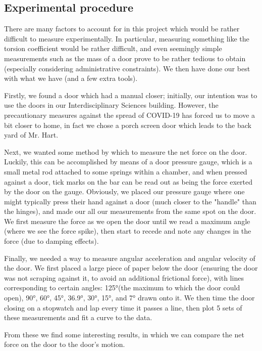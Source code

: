     \subsection{Experimental procedure}
    There are many factors to account for in this project which would be rather difficult to measure experimentally. In particular, measuring something like the torsion coefficient would be rather difficult, and even seemingly simple measurements such as the mass of a door prove to be rather tedious to obtain (especially considering administrative constraints). We then have done our best with what we have (and a few extra tools).\par
    Firstly, we found a door which had a manual closer; initially, our intention was to use the doors in our Interdisciplinary Sciences building. However, the precautionary measures against the spread of COVID-19 has forced us to move a bit closer to home, in fact we chose a porch screen door which leads to the back yard of Mr. Hart.\par
    Next, we wanted some method by which to measure the net force on the door. Luckily, this can be accomplished by means of a door pressure gauge, which is a small metal rod attached to some springs within a chamber, and when pressed against a door, tick marks on the bar can be read out as being the force exerted by the door on the gauge. Obviously, we placed our pressure gauge where one might typically press their hand against a door (much closer to the "handle" than the hinges), and made our all our measurements from the same spot on the door. We first measure the force as we open the door until we read a maximum angle (where we see the force spike), then start to recede and note any changes in the force (due to damping effects).\par
    Finally, we needed a way to measure angular acceleration and angular velocity of the door. We first placed a large piece of paper below the door (ensuring the door was not scraping against it, to avoid an additional frictional force), with lines corresponding to certain angles: 125°(the maximum to which the door could open), 90°, 60°, 45°, 36.9°, 30°, 15°, and 7° drawn onto it. We then time the door closing on a stopwatch and lap every time it passes a line, then plot 5 sets of these measurements and fit a curve to the data.\par
    From these we find some interesting results, in which we can compare the net force on the door to the door's motion.